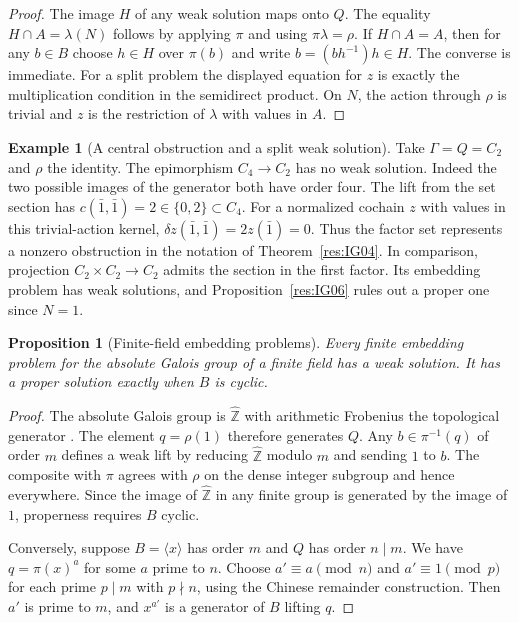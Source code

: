 \documentclass[11pt,oneside,openany]{book}
\newtheorem{proposition}[theorem]{Proposition}
\theoremstyle{definition}
\newtheorem{example}[theorem]{Example}
\theoremstyle{remark}
\begin{document}
\begin{proof}
The image \(H\) of any weak solution maps onto \(Q\).
The equality \(H\cap A=\lambda(N)\) follows by applying \(\pi\)
and using \(\pi\lambda=\rho\). If \(H\cap A=A\), then for
any \(b\in B\) choose \(h\in H\) over \(\pi(b)\) and write
\(b=(bh^{-1})h\in H\). The converse is immediate.
For a split problem the displayed equation for \(z\) is exactly
the multiplication condition in the semidirect product. On \(N\),
the action through \(\rho\) is trivial and \(z\) is the
restriction of \(\lambda\) with values in \(A\).
\end{proof}

\begin{example}[A central obstruction and a split weak solution]
\label{res:IG07}
Take \(\Gamma=Q=C_2\) and \(\rho\) the identity. The epimorphism
\(C_4\to C_2\) has no weak solution. Indeed the two possible
images of the generator both have order four. The lift from the
set section has \(c(\bar 1,\bar 1)=2\in\{0,2\}\subset C_4\).
For a normalized cochain \(z\) with values in this trivial-action
kernel, \(\delta z(\bar 1,\bar 1)=2z(\bar 1)=0\). Thus the
factor set represents a nonzero obstruction in the notation of
Theorem~\ref{res:IG04}. In comparison, projection
\(C_2\times C_2\to C_2\) admits the section in the first
factor. Its embedding problem has weak solutions, and
Proposition~\ref{res:IG06} rules out a proper one since \(N=1\).
\end{example}

\begin{proposition}[Finite-field embedding problems]
\label{res:IG08}
Every finite embedding problem for the absolute Galois group of
a finite field has a weak solution. It has a proper solution
exactly when \(B\) is cyclic.
\end{proposition}

\begin{proof}
The absolute Galois group is \(\widehat{\mathbb Z}\) with
arithmetic Frobenius the topological generator
\cite[Results E04, E06 and E07]{mg-aft}. The element
\(q=\rho(1)\) therefore generates \(Q\). Any \(b\in\pi^{-1}(q)\)
of order \(m\) defines a weak lift by reducing
\(\widehat{\mathbb Z}\) modulo \(m\) and sending \(1\) to \(b\).
The composite with \(\pi\) agrees with \(\rho\) on the dense
integer subgroup and hence everywhere. Since the image of
\(\widehat{\mathbb Z}\) in any finite group is generated by
the image of \(1\), properness requires \(B\) cyclic.

Conversely, suppose \(B=\langle x\rangle\) has order \(m\) and
\(Q\) has order \(n\mid m\). We have
\(q=\pi(x)^a\) for some \(a\) prime to \(n\).
Choose \(a'\equiv a\pmod n\) and \(a'\equiv1\pmod p\) for
each prime \(p\mid m\) with \(p\nmid n\), using the Chinese
remainder construction. Then \(a'\) is prime to \(m\), and
\(x^{a'}\) is a generator of \(B\) lifting \(q\).
\end{proof}
\end{document}
